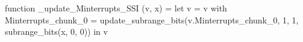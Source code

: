 function _update_Minterrupts_SSI (v, x) = let v = { v with Minterrupts_chunk_0 = update_subrange_bits(v.Minterrupts_chunk_0, 1, 1, subrange_bits(x, 0, 0)) } in
  v
